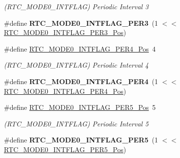 \begin{DoxyCompactItemize}
\begin{DoxyCompactList}\small\item\em (R\+T\+C\+\_\+\+M\+O\+D\+E0\+\_\+\+I\+N\+T\+F\+L\+A\+G) Periodic Interval 3 \end{DoxyCompactList}\item 
\hypertarget{group___s_a_m_l21___r_t_c_ga4e602b6c59418c5fa2347386c3339f39}{}\#define {\bfseries R\+T\+C\+\_\+\+M\+O\+D\+E0\+\_\+\+I\+N\+T\+F\+L\+A\+G\+\_\+\+P\+E\+R3}~(1 $<$$<$ \hyperlink{group___s_a_m_l21___r_t_c_ga4ec3dbad46e263fe7e6cf87d8e866493}{R\+T\+C\+\_\+\+M\+O\+D\+E0\+\_\+\+I\+N\+T\+F\+L\+A\+G\+\_\+\+P\+E\+R3\+\_\+\+Pos})\label{group___s_a_m_l21___r_t_c_ga4e602b6c59418c5fa2347386c3339f39}

\item 
\hypertarget{group___s_a_m_l21___r_t_c_gad87f6e35f1b256d73b948947f79759d7}{}\#define \hyperlink{group___s_a_m_l21___r_t_c_gad87f6e35f1b256d73b948947f79759d7}{R\+T\+C\+\_\+\+M\+O\+D\+E0\+\_\+\+I\+N\+T\+F\+L\+A\+G\+\_\+\+P\+E\+R4\+\_\+\+Pos}~4\label{group___s_a_m_l21___r_t_c_gad87f6e35f1b256d73b948947f79759d7}

\begin{DoxyCompactList}\small\item\em (R\+T\+C\+\_\+\+M\+O\+D\+E0\+\_\+\+I\+N\+T\+F\+L\+A\+G) Periodic Interval 4 \end{DoxyCompactList}\item 
\hypertarget{group___s_a_m_l21___r_t_c_ga46671e8329351cd57023fcc42d8b12ac}{}\#define {\bfseries R\+T\+C\+\_\+\+M\+O\+D\+E0\+\_\+\+I\+N\+T\+F\+L\+A\+G\+\_\+\+P\+E\+R4}~(1 $<$$<$ \hyperlink{group___s_a_m_l21___r_t_c_gad87f6e35f1b256d73b948947f79759d7}{R\+T\+C\+\_\+\+M\+O\+D\+E0\+\_\+\+I\+N\+T\+F\+L\+A\+G\+\_\+\+P\+E\+R4\+\_\+\+Pos})\label{group___s_a_m_l21___r_t_c_ga46671e8329351cd57023fcc42d8b12ac}

\item 
\hypertarget{group___s_a_m_l21___r_t_c_ga3a4c0acb91782678cea0d6263e2bba1e}{}\#define \hyperlink{group___s_a_m_l21___r_t_c_ga3a4c0acb91782678cea0d6263e2bba1e}{R\+T\+C\+\_\+\+M\+O\+D\+E0\+\_\+\+I\+N\+T\+F\+L\+A\+G\+\_\+\+P\+E\+R5\+\_\+\+Pos}~5\label{group___s_a_m_l21___r_t_c_ga3a4c0acb91782678cea0d6263e2bba1e}

\begin{DoxyCompactList}\small\item\em (R\+T\+C\+\_\+\+M\+O\+D\+E0\+\_\+\+I\+N\+T\+F\+L\+A\+G) Periodic Interval 5 \end{DoxyCompactList}\item 
\hypertarget{group___s_a_m_l21___r_t_c_ga07d0dc111b8a77ee1e177b9114ec28c1}{}\#define {\bfseries R\+T\+C\+\_\+\+M\+O\+D\+E0\+\_\+\+I\+N\+T\+F\+L\+A\+G\+\_\+\+P\+E\+R5}~(1 $<$$<$ \hyperlink{group___s_a_m_l21___r_t_c_ga3a4c0acb91782678cea0d6263e2bba1e}{R\+T\+C\+\_\+\+M\+O\+D\+E0\+\_\+\+I\+N\+T\+F\+L\+A\+G\+\_\+\+P\+E\+R5\+\_\+\+Pos})\label{group___s_a_m_l21___r_t_c_ga07d0dc111b8a77ee1e177b9114ec28c1}


\end{DoxyCompactItemize}
